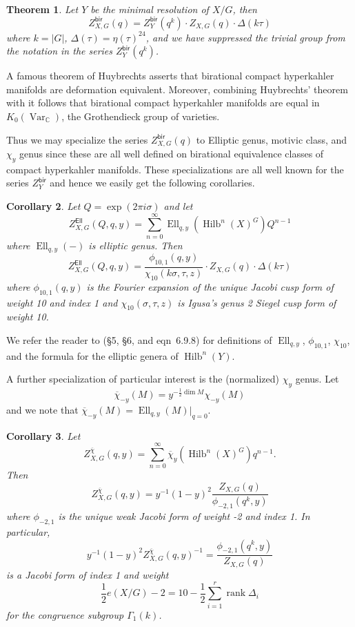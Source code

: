 \documentclass{amsart}
\newtheorem{theorem}{Theorem}[section]
\newtheorem{corollary}[theorem]{Corollary}
\theoremstyle{definition}
\newcommand{\half}{\frac{1}{2}}
\newcommand{\CC} {{\mathbb C}}          %
\newcommand{\bir}{\mathsf{bir}}
\newcommand{\Ell}{\mathsf{Ell}}
\newcommand{\Ellqy}{\operatorname{Ell}_{q,y}}
\newcommand{\chibar}{\overline{\chi}}
\newcommand{\Hilb}{\operatorname{Hilb}}
\begin{document}
\begin{theorem}\label{thm: Formula for Zbir}
Let $Y$ be the minimal resolution of $X/G$, then
\[
Z^{\bir}_{X,G} (q) = Z^{\bir}_{Y}(q^{k})\cdot Z_{X,G}(q)\cdot \Delta (k\tau )
\]
where $k=|G|$, $\Delta (\tau ) = \eta (\tau )^{24}$, and we have
suppressed the trivial group from the notation in the series
$Z^{\bir}_{Y}(q^{k})$.
\end{theorem}

A famous theorem of Huybrechts \cite[Thm~4.6]{Huybrechts} asserts that
birational compact hyperkahler manifolds are deformation
equivalent. Moreover, combining Huybrechts' theorem with
\cite[Prop~3.21]{Nicaise-Shinder} it follows that birational compact
hyperkahler manifolds are equal in $K_{0}(\operatorname{Var}_{\CC})$,
the Grothendieck group of varieties.

Thus we may specialize the series $Z^{\bir}_{X,G}(q)$ to Elliptic
genus, motivic class, and $\chi_{y}$ genus since these are all well
defined on birational equivalence classes of compact hyperkahler
manifolds. These specializations are all well known for the series
$Z^{\bir}_{Y}$ and hence we easily get the following corollaries.

\begin{corollary}\label{cor: Zell formula}
Let $Q=\exp\left(2\pi i\sigma \right)$ and let
\[
Z^{\Ell}_{X,G}(Q,q,y) = \sum_{n=0}^{\infty} \Ellqy
\left(\Hilb^{n}(X)^{G} \right) Q^{n-1}
\]
where $\Ellqy (-)$ is elliptic genus. Then
\[
Z^{\Ell}_{X,G}(Q,q,y) = \frac{\phi_{10,1}(q ,y)}{\chi_{10}(k\sigma
,\tau ,z)} \cdot Z_{X,G}(q)\cdot \Delta (k\tau )
\]
where $\phi_{10,1}(q ,y)$ is the Fourier expansion of the unique Jacobi cusp form of weight
10 and index 1 and $\chi_{10}(\sigma ,\tau ,z)$ is Igusa's genus 2
Siegel cusp form of weight 10. 
\end{corollary}
We refer the reader to \cite{Pietromonaco_2018} (\S 5, \S 6, and
eqn~6.9.8) for definitions of $\Ellqy$, $\phi_{10,1}$, $\chi_{10}$,
and the formula for the elliptic genera of $\Hilb^{n}(Y)$.

A further specialization of particular interest is the (normalized)
$\chi_{y}$ genus. Let 
\[
\chibar_{-y}(M) = y^{-\half \dim
M}\chi_{-y}(M)
\]
and we note that $\chibar_{-y}(M) = \Ellqy
(M)|_{q=0}$.

\begin{corollary}\label{cor: Zchiy formula}
Let
\[
Z^{\chibar}_{X,G}(q,y) = \sum_{n=0}^{\infty}
\chibar_{y}\left(\Hilb^{n}(X)^{G} \right) q^{n-1} .
\]
Then
\[
Z^{\chibar}_{X,G}(q,y) = y^{-1}(1-y)^{2} \frac{Z_{X,G}(q)}{\phi_{-2,1}(q^{k},y)}
\]
where $\phi_{-2,1}$ is the unique weak Jacobi form of weight -2
and index 1. In particular,
\[
y^{-1}(1-y)^{2} Z^{\chibar}_{X,G}(q,y)^{-1} =\frac{
\phi_{-2,1}(q^{k},y)}{Z_{X,G}(q)} 
\]
is a Jacobi form of index 1 and weight 
\[
\half e(X/G)-2 = 10-\half \sum_{i=1}^{r} \operatorname{rank} \Delta_{i}
\]
for the congruence subgroup $\Gamma_{1}(k)$. 
\end{corollary}
\end{document}
